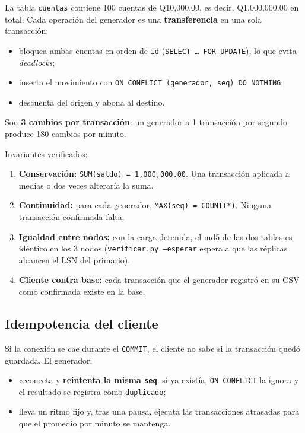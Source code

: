 \documentclass[11pt,a4paper]{article}
\newcommand{\cod}[1]{\texttt{#1}}
\begin{document}
La tabla \cod{cuentas} contiene 100 cuentas de Q10,000.00, es decir, Q1,000,000.00 en total. Cada operación del generador es una \textbf{transferencia} en una sola transacción:
\begin{itemize}
  \item bloquea ambas cuentas en orden de \cod{id} (\cod{SELECT \ldots{} FOR UPDATE}), lo que evita \emph{deadlocks};
  \item inserta el movimiento con \cod{ON CONFLICT (generador, seq) DO NOTHING};
  \item descuenta del origen y abona al destino.
\end{itemize}

Son \textbf{3 cambios por transacción}: un generador a 1 transacción por segundo produce 180 cambios por minuto.

Invariantes verificados:
\begin{enumerate}
  \item \textbf{Conservación:} \cod{SUM(saldo) = 1,000,000.00}. Una transacción aplicada a medias o dos veces alteraría la suma.
  \item \textbf{Continuidad:} para cada generador, \cod{MAX(seq) = COUNT(*)}. Ninguna transacción confirmada falta.
  \item \textbf{Igualdad entre nodos:} con la carga detenida, el md5 de las dos tablas es idéntico en los 3 nodos (\cod{verificar.py --esperar} espera a que las réplicas alcancen el LSN del primario).
  \item \textbf{Cliente contra base:} cada transacción que el generador registró en su CSV como confirmada existe en la base.
\end{enumerate}

\subsection{Idempotencia del cliente}

Si la conexión se cae durante el \cod{COMMIT}, el cliente no sabe si la transacción quedó guardada. El generador:
\begin{itemize}
  \item reconecta y \textbf{reintenta la misma \cod{seq}}: si ya existía, \cod{ON CONFLICT} la ignora y el resultado se registra como \cod{duplicado};
  \item lleva un ritmo fijo y, tras una pausa, ejecuta las transacciones atrasadas para que el promedio por minuto se mantenga.
\end{itemize}
\end{document}
